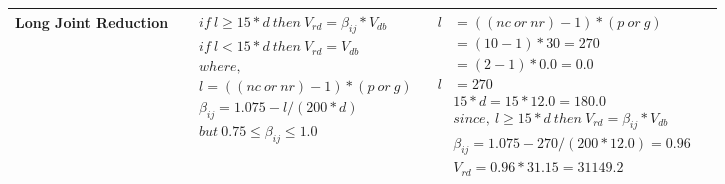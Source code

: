 \documentclass{article}%
\begin{document}
\begin{longtable}{|p{4cm}|p{5cm}|p{5.5cm}|p{1.5cm}|}
\hline%
Long Joint Reduction&$\begin{aligned} &if~l\geq 15 * d~then~V_{rd} = \beta_{ij} * V_{db} \\ & if~l < 15 * d~then~V_{rd} = V_{db} \\ & where,\\ & l = ((nc~or~nr) - 1) * (p~or~g) \\ & \beta_{ij} = 1.075 - l/(200 * d) \\ & but~0.75\leq\beta_{ij}\leq1.0 \end{aligned}$&$\begin{aligned} l&= ((nc~or~nr) - 1) * (p~or~g) \\  &= (10 - 1) * 30=270\\  &= (2 - 1) * 0.0=0.0\\  l&= 270\\ & 15 * d = 15 * 12.0 = 180.0 \\ & since,~l \geq 15 * d~then~V_{rd} = \beta_{ij} * V_{db} \\ & \beta_{ij} = 1.075 - 270/(200*12.0) =0.96\\ & V_{rd} = 0.96 * 31.15=31149.2 \end{aligned}$&\\%
\hline%
\end{longtable}

%
\newpage%
\end{document}
